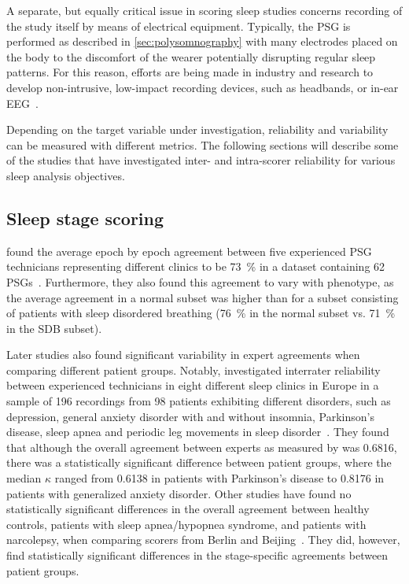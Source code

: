         A separate, but equally critical issue in scoring sleep studies concerns recording of the study itself by means of electrical equipment.
        Typically, the \ac{PSG} is performed as described in \cref{sec:polysomnography} with many electrodes placed on the body to the discomfort of the wearer potentially disrupting regular sleep patterns.
        For this reason, efforts are being made in industry and research to develop non-intrusive, low-impact recording devices, such as headbands, or in-ear \ac{EEG}~\cite{Mikkelsen2017,Mikkelsen2019}.
        
        Depending on the target variable under investigation, reliability and variability can be measured with different metrics.
        The following sections will describe some of the studies that have investigated inter- and intra-scorer reliability for various sleep analysis objectives.
        
        
        \subsection{Sleep stage scoring}\label{sec:challenges-sleep-stage-scoring}
        
            \citeauthor{Norman2000} found the average epoch by epoch agreement between five experienced PSG technicians representing different clinics to be \SI{73}{\percent} in a dataset containing 62 PSGs~\cite{Norman2000}.
            Furthermore, they also found this agreement to vary with phenotype, as the average agreement in a normal subset was higher than for a subset consisting of patients with sleep disordered breathing (\SI{76}{\percent} in the normal subset vs. \SI{71}{\percent} in the SDB subset).
            
            Later studies also found significant variability in expert agreements when comparing different patient groups. 
            Notably, \citeauthor{Danker-Hopfe2004} investigated interrater reliability between experienced technicians in eight different sleep clinics in Europe in a sample of 196 recordings from 98 patients exhibiting different disorders, such as depression, general anxiety disorder with and without insomnia, Parkinson's disease, sleep apnea and periodic leg movements in sleep disorder~\cite{Danker-Hopfe2004}.
            They found that although the overall agreement between experts as measured by \cohen{} was \num{0.6816}, there was a statistically significant difference between patient groups, where the median $\kappa$ ranged from \num{0.6138} in patients with Parkinson's disease to \num{0.8176} in patients with generalized anxiety disorder.
            Other studies have found no statistically significant differences in the overall agreement between healthy controls, patients with sleep apnea/hypopnea syndrome, and patients with narcolepsy, when comparing scorers from Berlin and Beijing~\cite{Zhang2015a}. 
            They did, however, find statistically significant differences in the stage-specific agreements between patient groups.
            
